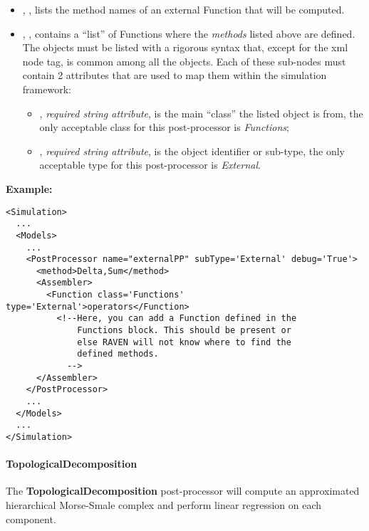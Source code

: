 \begin{itemize}
  \item {}, ,
  lists the method names of an external Function that will be computed.
  \item {}, , contains a 
  ``list'' of Functions where the \textit{methods} listed above are defined.
  The objects must be listed with a rigorous syntax that, except for the xml
  node tag, is common among all the objects.
  Each of these sub-nodes must contain 2 attributes that are used to map them
  within the simulation framework:

   \begin{itemize}
     \item {}, \textit{required string attribute}, is the main
     ``class'' the listed object is from, the only acceptable class for
     this post-processor is \textit{Functions};
     \item {}, \textit{required string attribute}, is the object
     identifier or sub-type, the only acceptable type for this post-processor is
     \textit{External}.
  \end{itemize}
\end{itemize}
\textbf{Example:}
\begin{lstlisting}[style=XML,morekeywords={subType,debug,name,class,type}]
<Simulation>
  ...
  <Models>
    ...
    <PostProcessor name="externalPP" subType='External' debug='True'>
      <method>Delta,Sum</method>
      <Assembler>
        <Function class='Functions' type='External'>operators</Function> 
          <!--Here, you can add a Function defined in the
              Functions block. This should be present or
              else RAVEN will not know where to find the
              defined methods.
            -->
      </Assembler>
    </PostProcessor>
    ...
  </Models>
  ...
</Simulation>
\end{lstlisting}
\paragraph{TopologicalDecomposition}
\label{TopologicalDecomposition}
The \textbf{TopologicalDecomposition} post-processor will compute an 
approximated hierarchical Morse-Smale complex and perform linear regression on
each component. 
%

